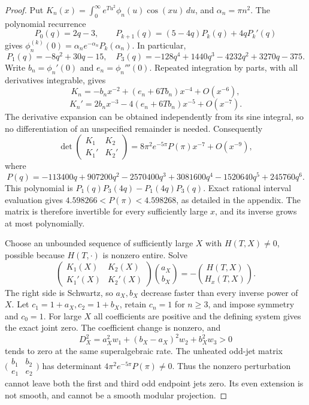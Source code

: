 \documentclass[11pt]{article}
\numberwithin{equation}{section}
\theoremstyle{definition}
\theoremstyle{remark}
\begin{document}
\begin{proof}
Put \(K_n(x)=\int_0^\infty e^{Tu^2}\phi_n(u)\cos(xu)\,du\),
and \(\alpha_n=\pi n^2\).
The polynomial recurrence
\[
 P_0(q)=2q-3,\qquad
 P_{k+1}(q)=(5-4q)P_k(q)+4qP_k'(q)
\]
gives
\(\phi_n^{(k)}(0)=\alpha_ne^{-\alpha_n}P_k(\alpha_n)\).
In particular,
\[
 P_1(q)=-8q^2+30q-15,\quad
 P_3(q)=-128q^4+1440q^3-4232q^2+3270q-375.
\]
Write \(b_n=\phi_n'(0)\) and \(e_n=\phi_n'''(0)\).
Repeated integration by parts, with all derivatives integrable, gives
\[
 K_n=-b_nx^{-2}+(e_n+6Tb_n)x^{-4}+O(x^{-6}),
\]
\[
 K_n'=2b_nx^{-3}-4(e_n+6Tb_n)x^{-5}+O(x^{-7}).
\]
The derivative expansion can be obtained independently from its sine
integral, so no differentiation of an unspecified remainder is needed.
Consequently
\[
 \det\begin{pmatrix}K_1&K_2\\K_1'&K_2'\end{pmatrix}
 =8\pi^2e^{-5\pi}P(\pi)x^{-7}+O(x^{-9}),
\]
where
\[
 P(q)=-113400q+907200q^2-2570400q^3
       +3081600q^4-1520640q^5+245760q^6.
\]
This polynomial is \(P_1(q)P_3(4q)-P_1(4q)P_3(q)\).
Exact rational interval evaluation gives
\(4.598266<P(\pi)<4.598268\), as detailed in the appendix.
The matrix is therefore invertible for every sufficiently large \(x\),
and its inverse grows at most polynomially.

Choose an unbounded sequence of sufficiently large \(X\) with
\(H(T,X)\ne0\), possible because \(H(T,\cdot)\) is nonzero entire.
Solve
\[
 \begin{pmatrix}K_1(X)&K_2(X)\\K_1'(X)&K_2'(X)\end{pmatrix}
 \binom{a_X}{b_X}
 =-\binom{H(T,X)}{H_x(T,X)} .
\]
The right side is Schwartz, so \(a_X,b_X\) decrease faster than every
inverse power of \(X\).  Let \(c_1=1+a_X,c_2=1+b_X\), retain
\(c_n=1\) for \(n\geq3\), and impose symmetry and \(c_0=1\).
For large \(X\) all coefficients are positive and the defining system
gives the exact joint zero.  The coefficient change is nonzero, and
\[
 D_X^2=a_X^2w_1+(b_X-a_X)^2w_2+b_X^2w_3>0
\]
tends to zero at the same superalgebraic rate.
The unheated odd-jet matrix
\(\bigl(\begin{smallmatrix}b_1&b_2\\e_1&e_2\end{smallmatrix}\bigr)\)
has determinant \(4\pi^2e^{-5\pi}P(\pi)\ne0\).
Thus the nonzero perturbation cannot leave both the first and third
odd endpoint jets zero.  Its even extension is not smooth, and cannot
be a smooth modular projection.
\end{proof}
\end{document}
